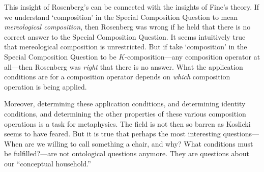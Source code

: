\documentclass[11pt]{article}
\begin{document}
\begin{spacing}{1.25}
This insight of Rosenberg's can be connected with the insights of
Fine's theory.  If we understand `composition' in the Special
Composition Question to mean {\em mereological composition}, then
Rosenberg was wrong if he held that there is no correct answer to the
Special Composition Question.  It seems intuitively true that
mereological composition is unrestricted.  But if take `composition'
in the Special Composition Question to be $K$-composition---any
composition operator at all---then Rosenberg was {\em right} that
there is no answer.  What the application conditions are for a
composition operator depends on {\em which} composition operation is
being applied.  

Moreover, determining these application conditions, and determining
identity conditions, and determining the other properties of these
various composition operations is a task for metaphysics.  The field
is not then so barren as Koslicki seems to have feared.  But it is
true that perhaps the most interesting questions---When are we willing
to call something a chair, and why?  What conditions must be
fulfilled?---are not ontological questions anymore.  They are
questions about our ``conceptual household.''

\begin{comment}
\section{Lessons}
What we have learned from examining Merricks' arguments is not that
there are no chairs.  What we have learned is that the language of
`composition' can fool us into thinking that there are no dogbushes
(or bligers).  Worse, it can undermine our confidence that ``there are
chairs'' is obviously true.  It may be that talk of things `composing'
other things gives the impression that `composition' is something that
things {\em do}---as if they were gathering or attaching themselves
together.  If we avoid terms like `composition', we can see that there
is no motivation for Merricks' nihilism, other than his thesis of
causal over-determination.  And given that his conclusion---that there
are no chairs---is obviously untrue, we should suspect that causal
efficacy is not required for ``there are chairs'' to be true.  Rather,
all that is required for ``there are chairs'' to be true is that
``there are things arranged chairwise'' be true.

In this section I have tentatively supported a version of
universalism.  However, in the next section we will examine a number
of powerful objections to all versions of universalism.

\end{comment}

\ifstandalone
\end{spacing}


\fi
\end{document}

